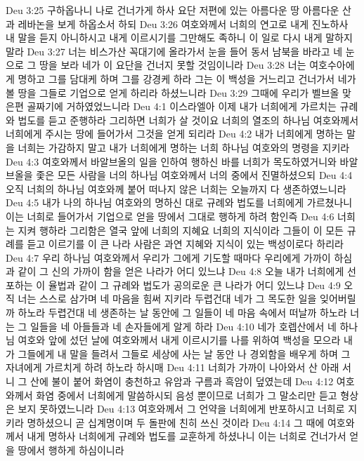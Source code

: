 Deu 3:25  구하옵나니 나로 건너가게 하사 요단 저편에 있는 아름다운 땅 아름다운 산과 레바논을 보게 하옵소서 하되
Deu 3:26  여호와께서 너희의 연고로 내게 진노하사 내 말을 듣지 아니하시고 내게 이르시기를 그만해도 족하니 이 일로 다시 내게 말하지 말라
Deu 3:27  너는 비스가산 꼭대기에 올라가서 눈을 들어 동서 남북을 바라고 네 눈으로 그 땅을 보라 네가 이 요단을 건너지 못할 것임이니라
Deu 3:28  너는 여호수아에게 명하고 그를 담대케 하며 그를 강경케 하라 그는 이 백성을 거느리고 건너가서 네가 볼 땅을 그들로 기업으로 얻게 하리라 하셨느니라
Deu 3:29  그때에 우리가 벨브올 맞은편 골짜기에 거하였었느니라
Deu 4:1  이스라엘아 이제 내가 너희에게 가르치는 규례와 법도를 듣고 준행하라 그리하면 너희가 살 것이요 너희의 열조의 하나님 여호와께서 너희에게 주시는 땅에 들어가서 그것을 얻게 되리라
Deu 4:2  내가 너희에게 명하는 말을 너희는 가감하지 말고 내가 너희에게 명하는 너희 하나님 여호와의 명령을 지키라
Deu 4:3  여호와께서 바알브올의 일을 인하여 행하신 바를 너희가 목도하였거니와 바알브올을 좇은 모든 사람을 너의 하나님 여호와께서 너의 중에서 진멸하셨으되
Deu 4:4  오직 너희의 하나님 여호와께 붙어 떠나지 않은 너희는 오늘까지 다 생존하였느니라
Deu 4:5  내가 나의 하나님 여호와의 명하신 대로 규례와 법도를 너희에게 가르쳤나니 이는 너희로 들어가서 기업으로 얻을 땅에서 그대로 행하게 하려 함인즉
Deu 4:6  너희는 지켜 행하라 그리함은 열국 앞에 너희의 지혜요 너희의 지식이라 그들이 이 모든 규례를 듣고 이르기를 이 큰 나라 사람은 과연 지혜와 지식이 있는 백성이로다 하리라
Deu 4:7  우리 하나님 여호와께서 우리가 그에게 기도할 때마다 우리에게 가까이 하심과 같이 그 신의 가까이 함을 얻은 나라가 어디 있느냐
Deu 4:8  오늘 내가 너희에게 선포하는 이 율법과 같이 그 규례와 법도가 공의로운 큰 나라가 어디 있느냐
Deu 4:9  오직 너는 스스로 삼가며 네 마음을 힘써 지키라 두렵건대 네가 그 목도한 일을 잊어버릴까 하노라 두렵건대 네 생존하는 날 동안에 그 일들이 네 마음 속에서 떠날까 하노라 너는 그 일들을 네 아들들과 네 손자들에게 알게 하라
Deu 4:10  네가 호렙산에서 네 하나님 여호와 앞에 섰던 날에 여호와께서 내게 이르시기를 나를 위하여 백성을 모으라 내가 그들에게 내 말을 들려서 그들로 세상에 사는 날 동안 나 경외함을 배우게 하며 그 자녀에게 가르치게 하려 하노라 하시매
Deu 4:11  너희가 가까이 나아와서 산 아래 서니 그 산에 불이 붙어 화염이 충천하고 유암과 구름과 흑암이 덮였는데
Deu 4:12  여호와께서 화염 중에서 너희에게 말씀하시되 음성 뿐이므로 너희가 그 말소리만 듣고 형상은 보지 못하였느니라
Deu 4:13  여호와께서 그 언약을 너희에게 반포하시고 너희로 지키라 명하셨으니 곧 십계명이며 두 돌판에 친히 쓰신 것이라
Deu 4:14  그 때에 여호와께서 내게 명하사 너희에게 규례와 법도를 교훈하게 하셨나니 이는 너희로 건너가서 얻을 땅에서 행하게 하심이니라
